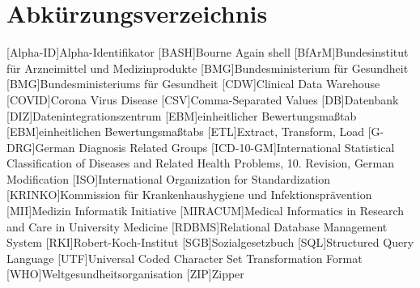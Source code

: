 \chapter*{Abkürzungsverzeichnis}
\setcounter{page}{4}
\begin{acronym}[ICD-10-GM]
	[Alpha-ID]{Alpha-Identifikator}
	[BASH]{Bourne Again shell}		
	[BfArM]{Bundesinstitut für Arzneimittel und Medizinprodukte}
	[BMG]{Bundesministerium für Gesundheit}	
	[BMG]{Bundesministeriums für Gesundheit}
	[CDW]{Clinical Data Warehouse}
	[COVID]{Corona Virus Disease}	
	[CSV]{Comma-Separated Values}	
	[DB]{Datenbank}
	[DIZ]{Datenintegrationszentrum}	
	[EBM]{einheitlicher Bewertungsmaßtab}
	[EBM]{einheitlichen Bewertungsmaßtabs}
	[ETL]{Extract, Transform, Load}
	[G-DRG]{German Diagnosis Related Groups}	
	[ICD-10-GM]{International Statistical Classification of Diseases and Related Health Problems, 10. Revision, German Modification}	
	[ISO]{International Organization for Standardization}
	[KRINKO]{Kommission für Krankenhaushygiene und Infektionsprävention}	
	[MII]{Medizin Informatik Initiative}
	[MIRACUM]{Medical Informatics in Research and Care in University Medicine}
	[RDBMS]{Relational Database Management System}	
	[RKI]{Robert-Koch-Institut}
	[SGB]{Sozialgesetzbuch}
	[SQL]{Structured Query Language}
	[UTF]{Universal Coded Character Set Transformation Format}
	[WHO]{Weltgesundheitsorganisation}
	[ZIP]{Zipper}
\end{acronym}

